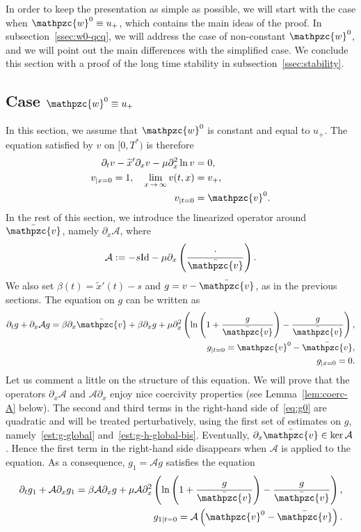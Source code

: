 \documentclass[AHL,Unicode,longabstracts,published]{cedram}
\newcommand{\p}{\partial}
\newcommand{\bv}{\bar{\mathpzc{v}}}
\newcommand{\cA}{\mathcal A}
\newcommand{\rId}{\mathrm{Id}}
\newcommand{\tv}{\mathpzc{v}}
\newcommand{\tw}{\mathpzc{w}}
\newcommand{\tx}{\widetilde{x}}
\newcommand{\tx}{\widetilde{x}}
\begin{document}
In order to keep the presentation as simple as possible, we will start with the case when $\tw^0\equiv u_+$, which contains the main ideas of the proof. In subsection~\ref{ssec:w0-qcq}, we will address the case of non-constant $\tw^0$, and we will point out the main differences with the simplified case. We conclude this section with a proof of the long time stability in subsection~\ref{ssec:stability}.

\subsection{Case \texorpdfstring{$\tw^0\equiv u_+$}{w0 cst}}

In this section, we assume that $\tw^0$ is constant and equal to $u_+$. The equation satisfied by $v$ on $[0,T^*)$ is therefore
\begin{align*}
\p_t v - \tx' \p_x v - \mu \p_x^2 \ln v &=0,\\
v_{|x=0}=1, \quad \lim_{x\,\to\,\infty}v(t,x) &=v_+,\\
v_{|t=0} &=\tv^0.
\end{align*}
In the rest of this section, we introduce the linearized operator around $\bv$, namely $\p_x \cA$, where
\[
\cA:=-s \rId - \mu \p_x\left(\frac{\cdot}{\bv}\right).
\]
We also set $\beta(t)=\tx'(t)-s$ and $g=v-\bv$, as in the previous sections. The equation on $g$ can be written as
\begin{equation}\label{eq:g0}
\begin{split}
\p_t g + \p_x \cA g= \beta \p_x \bv + \beta \p_x g + \mu \p_x^2\left(\ln\left(1+ \frac{g}{\bv}\right) - \frac{g}{\bv}\right),\\
g_{|t=0}=\tv^0-\bv,\\
g_{|x=0}=0.
\end{split}
\end{equation} 
Let us comment a little on the structure of this equation. We will prove that the operators $\p_x \cA$ and $\cA \p_x$ enjoy nice coercivity properties (see Lemma~\ref{lem:coerc-A} below). The second and third terms in the right-hand side of~\eqref{eq:g0} are quadratic and will be treated perturbatively, using the first set of estimates on $g$, namely~\eqref{est:g-global} and~\eqref{est:g-h-global-bis}. Eventually, $\p_x \bv\in \ker \cA$. Hence the first term in the right-hand side disappears when $\cA$ is applied to the equation. As a consequence, $g_1=\cA g$ satisfies the equation
\begin{equation}\label{eq:g1}
\begin{split}
\p_t g_1 + \cA \p_x g_1= \beta \cA \p_x g + \mu \cA \p_x^2\left(\ln\left(1+ \frac{g}{\bv}\right) - \frac{g}{\bv}\right),\\
g_{1|t=0}=\cA\left(\tv^0-\bv\right).
\end{split}
\end{equation}
\end{document}
